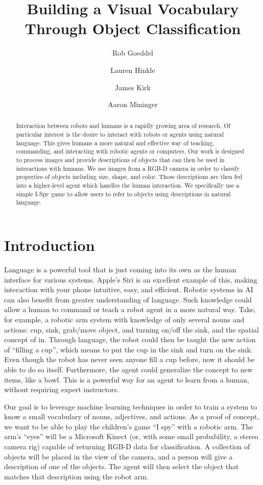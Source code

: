 \documentclass[11pt]{article}
\title{Building a Visual Vocabulary Through Object Classification}
\author{Rob Goeddel \and Lauren Hinkle \and James Kirk \and Aaron Mininger}
\date{}
\newcommand{\xxx}[1]{{\bf \color{red} #1}}
\begin{document}
\maketitle

\begin{abstract}
Interaction between robots and humans is a rapidly growing area of research. Of particular interest is the desire to interact with robots or agents using natural language. This gives humans a more natural and effective way of teaching, commanding, and interacting with robotic agents or computers. Our work is designed to process images and provide descriptions of objects that can then be used in interactions with humans. We use images from a RGB-D camera in order to classify properties of objects including size, shape, and color. Those descriptions are then fed into a higher-level agent which handles the human interaction. We specifically use a simple I-Spy game to allow users to refer to objects using descriptions in natural language.
\end{abstract}

\section{Introduction}
Language is a powerful tool that is just coming into its own as the human
interface for various systems. Apple's Siri is an excellent example of this, making interaction with your phone intuitive, easy, and efficient. Robotic systems in AI can also benefit from greater understanding of
language. Such knowledge could allow a human to command or teach a robot agent in a more natural way. Take, for example, a robotic arm system with knowledge of only
several nouns and actions: cup, sink, grab/move object, and turning on/off
the sink, and the spatial concept of in. Through language, the robot could then be taught the new action of ``filling a cup'', which means to put the cup in the sink and turn on the
sink. Even though the robot has never seen anyone fill a cup before, now
it should be able to do so itself. Furthermore, the agent could generalize the concept to new items, like a bowl. This is a powerful
way for an agent to learn from a human, without requiring expert instructors.

Our goal is to leverage machine learning techniques in order to train a system to know a small vocabulary of nouns, adjectives,
and actions. As a proof of concept, we want to be able to play the children's
game ``I spy'' with a robotic arm. The arm's ``eyes'' will be a Microsoft
Kinect (or, with some small probability, a stereo camera rig) capable of
returning RGB-D data for classification. A collection of objects will be placed in the view of the camera, and a person will give a description of one of the objects. The agent will then select the object that matches that description using the robot arm.
\end{document}

